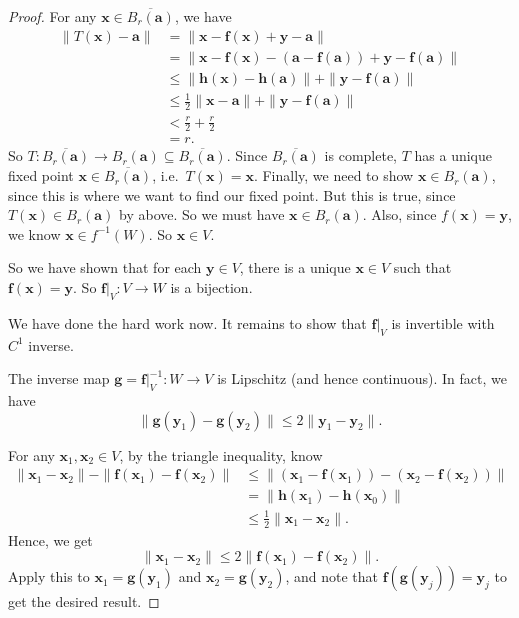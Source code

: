 \documentclass[a4paper]{article}
\begin{document}
\begin{proof}
  For any $\mathbf{x}\in \overline{B_r(\mathbf{a})}$, we have
  \begin{align*}
    \|T(\mathbf{x}) - \mathbf{a}\| &= \|\mathbf{x} - \mathbf{f}(\mathbf{x}) + \mathbf{y} - \mathbf{a}\|\\
    &= \|\mathbf{x} - \mathbf{f}(\mathbf{x}) - (\mathbf{a} - \mathbf{f}(\mathbf{a})) + \mathbf{y} - \mathbf{f}(\mathbf{a})\|\\
    &\leq \|\mathbf{h}(\mathbf{x}) - \mathbf{h}(\mathbf{a})\| + \|\mathbf{y} - \mathbf{f}(\mathbf{a})\|\\
    &\leq \frac{1}{2} \|\mathbf{x} - \mathbf{a}\| + \|\mathbf{y} - \mathbf{f}(\mathbf{a})\|\\
    &< \frac{r}{2} + \frac{r}{2}\\
    &= r.
  \end{align*}
  So $T: \overline{B_r(\mathbf{a})} \to B_r(\mathbf{a}) \subseteq \overline{B_r(\mathbf{a})}$. Since $\overline{B_r(\mathbf{a})}$ is complete, $T$ has a unique fixed point $\mathbf{x} \in \overline{B_r(\mathbf{a})}$, i.e.\ $T(\mathbf{x}) = \mathbf{x}$. Finally, we need to show $\mathbf{x} \in B_r(\mathbf{a})$, since this is where we want to find our fixed point. But this is true, since $T(\mathbf{x}) \in B_r(\mathbf{a})$ by above. So we must have $\mathbf{x} \in B_r(\mathbf{a})$. Also, since $f(\mathbf{x}) = \mathbf{y}$, we know $\mathbf{x} \in f^{-1}(W)$. So $\mathbf{x} \in V$.

  So we have shown that for each $\mathbf{y} \in V$, there is a unique $\mathbf{x} \in V$ such that $\mathbf{f}(\mathbf{x}) = \mathbf{y}$. So $\mathbf{f}|_V: V \to W$ is a bijection.

  We have done the hard work now. It remains to show that $\mathbf{f}|_V$ is invertible with $C^1$ inverse.

  \begin{claim}
    The inverse map $\mathbf{g} = \mathbf{f}|_V^{-1}: W \to V$ is Lipschitz (and hence continuous). In fact, we have
    \[
      \|\mathbf{g}(\mathbf{y}_1) - \mathbf{g}(\mathbf{y}_2)\| \leq 2 \|\mathbf{y}_1 - \mathbf{y}_2\|.
    \]
  \end{claim}

  For any $\mathbf{x}_1, \mathbf{x}_2 \in V$, by the triangle inequality, know
  \begin{align*}
    \|\mathbf{x}_1 - \mathbf{x}_2\| - \|\mathbf{f}(\mathbf{x}_1) - \mathbf{f}(\mathbf{x}_2)\| &\leq \|(\mathbf{x}_1 - \mathbf{f}(\mathbf{x}_1)) - (\mathbf{x}_2 - \mathbf{f}(\mathbf{x}_2))\|\\
    &= \|\mathbf{h}(\mathbf{x}_1) - \mathbf{h}(\mathbf{x}_0)\|\\
    &\leq \frac{1}{2}\|\mathbf{x}_1 - \mathbf{x}_2\|.
  \end{align*}
  Hence, we get
  \[
    \|\mathbf{x}_1 - \mathbf{x}_2\| \leq 2 \|\mathbf{f}(\mathbf{x}_1) - \mathbf{f}(\mathbf{x}_2)\|.
  \]
  Apply this to $\mathbf{x}_1 = \mathbf{g}(\mathbf{y}_1)$ and $\mathbf{x}_2 = \mathbf{g}(\mathbf{y}_2)$, and note that $\mathbf{f}(\mathbf{g}(\mathbf{y}_j)) = \mathbf{y}_j$ to get the desired result.


\end{proof}
\end{document}
